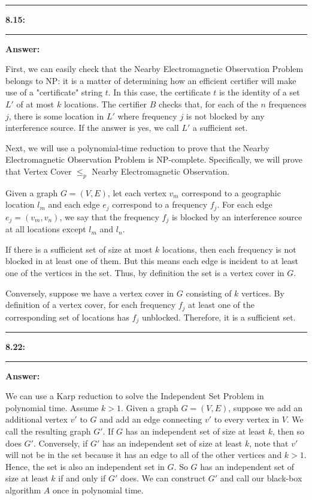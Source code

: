 \documentclass[11pt]{article}
\newcommand\question[2]{\vspace{.25in}\hrule\textbf{#1: #2}\vspace{.5em}\hrule\vspace{.10in}}
\newcommand\answer{\vspace{.10in}\textbf{Answer: }}
\begin{document}
\raggedright
\newcommand\NAME{Stewart Dulaney}  %
\newcommand\SID{904-064-791}     %
\newcommand\HWNUM{2}              %

\question{8.15}{}

\answer

First, we can easily check that the Nearby Electromagnetic Observation Problem belongs to NP: it is a matter of determining how an efficient certifier will make use of a "certificate" string $t$. In this case, the certificate $t$ is the identity of a set $L'$ of at most $k$ locations. The certifier $B$ checks that, for each of the $n$ frequences $j$, there is some location in $L'$ where frequency $j$ is not blocked by any interference source. If the answer is yes, we call $L'$ a sufficient set.\newline

Next, we will use a polynomial-time reduction to prove that the Nearby Electromagnetic Observation Problem is NP-complete. Specifically, we will prove that Vertex Cover $\leq_p$ Nearby Electromagnetic Observation.\newline

Given a graph $G = (V, E)$, let each vertex $v_m$ correspond to a geographic location $l_m$ and each edge $e_j$ correspond to a frequency $f_j$. For each edge $e_j = (v_m, v_n)$, we say that the frequency $f_j$ is blocked by an interference source at all locations except $l_m$ and $l_n$.\newline

If there is a sufficient set of size at most $k$ locations, then each frequency is not blocked in at least one of them. But this means each edge is incident to at least one of the vertices in the set. Thus, by definition the set is a vertex cover in $G$.\newline

Conversely, suppose we have a vertex cover in $G$ consisting of $k$ vertices. By definition of a vertex cover, for each frequency $f_j$ at least one of the corresponding set of locations has $f_j$ unblocked. Therefore, it is a sufficient set.


\clearpage

\question{8.22}{}

\answer

We can use a Karp reduction to solve the Independent Set Problem in polynomial time. Assume $k > 1$. Given a graph $G = (V, E)$, suppose we add an additional vertex $v'$ to $G$ and add an edge connecting $v'$ to every vertex in $V$. We call the resulting graph $G'$. If $G$ has an independent set of size at least $k$, then so does $G'$. Conversely, if $G'$ has an independent set of size at least $k$, note that $v'$ will not be in the set because it has an edge to all of the other vertices and $k > 1$. Hence, the set is also an independent set in $G$. So $G$ has an independent set of size at least $k$ if and only if $G'$ does. We can construct $G'$ and call our black-box algorithm $A$ once in polynomial time.
\end{document}
